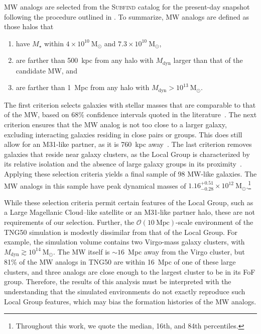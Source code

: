 \documentclass[twocolumn,tighten,twocolappendix]{aastex701}
\newcommand{\subfind}{\textsc{Subfind}}
\newcommand{\Msun}{\ensuremath{\mathrm{M}_\odot}}
\newcommand{\Mdyn}{\ensuremath{M_\mathrm{dyn}}}
\newcommand{\osim}{\mathord{\sim}}
\begin{document}
MW analogs are selected from the \subfind{} catalog for the present-day snapshot following the procedure outlined in \citet{2025ApJ...983..119F}. To summarize, MW analogs are defined as those halos that 
\begin{enumerate}
    \item have $M_\star$ within $4\times10^{10}~\Msun$ and $7.3\times10^{10}~\Msun$,
    \item are farther than 500~kpc from any halo with \Mdyn{} larger than that of the candidate MW, and
    \item are farther than 1~Mpc from any halo with $\Mdyn>10^{13}~\Msun$.
\end{enumerate}

The first criterion selects galaxies with stellar masses that are comparable to that of the MW, based on $68\%$ confidence intervals quoted in the literature~\citep{2006MNRAS.372.1149F, 2011MNRAS.414.2446M, 2015ApJ...806...96L, 2016ARA&A..54..529B, 2016ApJ...831...71L, 2017MNRAS.465...76M, 2020MNRAS.494.4291C}. The next criterion ensures that the MW analog is not too close to a larger galaxy, excluding interacting galaxies residing in close pairs or groups. This does still allow for an M31-like partner, as it is 760~kpc away~\citep{2017MNRAS.468.3428P, 2018MNRAS.475.4043K,2021ApJ...920...84L, 2022ApJ...928L...5B, 2023PhRvD.107j3003V, 2023MNRAS.521.4863S, 2023ApJ...956...15L}. The last criterion removes galaxies that reside near galaxy clusters, as the Local Group is characterized by its relative isolation and the absence of large galaxy groups in its proximity~\citep{2005AJ....129..178K}. Applying these selection criteria yields a final sample of 98 MW-like galaxies. The MW analogs in this sample have peak dynamical masses of $1.16^{+0.51}_{-0.28} \times 10^{12}~\Msun$.\footnote{Throughout this work, we quote the median, 16th, and 84th percentiles.}

While these selection criteria permit certain features of the Local Group, such as a Large Magellanic Cloud--like satellite or an M31-like partner halo, these are not requirements of our selection. Further, the $\mathcal{O}(10~\mathrm{Mpc})$-scale environment of the TNG50 simulation is modestly dissimilar from that of the Local Group. For example, the simulation volume contains two Virgo-mass galaxy clusters, with $\Mdyn \gtrsim 10^{14}~\Msun$. The MW itself is $\osim 16$~Mpc away from the Virgo cluster, but 81\% of the MW analogs in TNG50 are within 16~Mpc of one of these large clusters, and three analogs are close enough to the largest cluster to be in its FoF group. Therefore, the results of this analysis must be interpreted with the understanding that the simulated environments do not exactly reproduce such Local Group features, which may bias the formation histories of the MW analogs.
\end{document}
